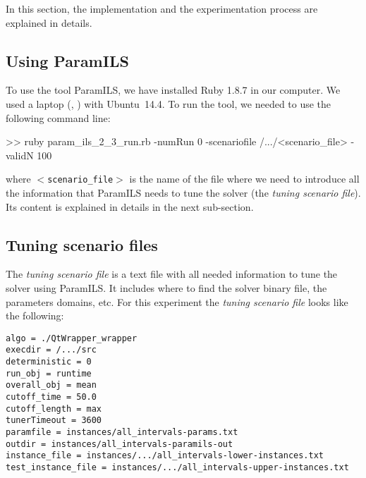 In this section, the implementation and the experimentation process are explained in details.

\subsection{Using ParamILS}

To use the tool {\sc ParamILS}, we have installed Ruby 1.8.7 in our computer. We used a laptop \mylaptopName (\mylaptopProc, \mylaptopMemo) with {\sc Ubuntu~14.4}. To run the tool, we needed to use the following command line:

\begin{BGVerbatim}
>> ruby param_ils_2_3_run.rb -numRun 0 -scenariofile /.../<scenario_file> -validN 100
\end{BGVerbatim}

where \texttt{$<$scenario\_file$>$} is the name of the file where we need to introduce all the information that {\sc ParamILS} needs to tune the solver (the \textit{tuning scenario file}). Its content is explained in details in the next sub-section.

\subsection{Tuning scenario files}

The {\it tuning scenario file} is a text file with all needed information to tune the solver using {\sc ParamILS}. It includes where to find the solver binary file, the parameters domains, etc. For this experiment the {\it tuning scenario file} looks like the following:

\begin{shadedbox}
	\texttt{algo = ./QtWrapper\_wrapper\\
		execdir = /.../src \\
		deterministic = 0 \\
		run\_obj = runtime \\
		overall\_obj = mean \\
		cutoff\_time = 50.0 \\
		cutoff\_length = max \\
		tunerTimeout = 3600 \\
		paramfile = instances/all\_intervals-params.txt \\
		outdir = instances/all\_intervals-paramils-out \\
		instance\_file = instances/.../all\_intervals-lower-instances.txt \\
		test\_instance\_file = instances/.../all\_intervals-upper-instances.txt \\
	}
\end{shadedbox}

